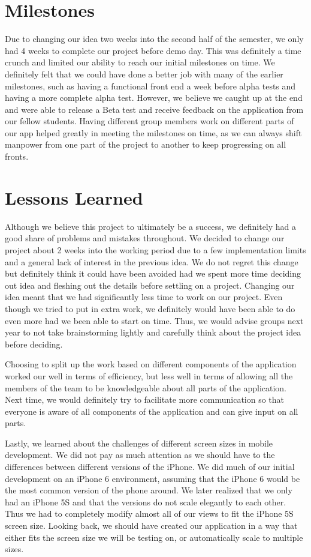 \documentclass[12pt]{article}
\begin{document}
\section{Milestones}
Due to changing our idea two weeks into the second half of the semester, we only had 4 weeks to complete our project before demo day. This was definitely a time crunch and limited our ability to reach our initial milestones on time. We definitely felt that we could have done a better job with many of the earlier milestones, such as having a functional front end a week before alpha tests and having a more complete alpha test. However, we believe we caught up at the end and were able to release a Beta test and receive feedback on the application from our fellow students. Having different group members work on different parts of our app helped greatly in meeting the milestones on time, as we can always shift manpower from one part of the project to another to keep progressing on all fronts.

\section{Lessons Learned}
Although we believe this project to ultimately be a success, we definitely had a good share of problems and mistakes throughout. We decided to change our project about 2 weeks into the working period due to a few implementation limits and a general lack of interest in the previous idea. We do not regret this change but definitely think it could have been avoided had we spent more time deciding out idea and fleshing out the details before settling on a project. Changing our idea meant that we had significantly less time to work on our project. Even though we tried to put in extra work, we definitely would have been able to do even more had we been able to start on time. Thus, we would advise groups next year to not take brainstorming lightly and carefully think about the project idea before deciding. 

Choosing to split up the work based on different components of the application worked our well in terms of efficiency, but less well in terms of allowing all the members of the team to be knowledgeable about all parts of the application. Next time, we would definitely try to facilitate more communication so that everyone is aware of all components of the application and can give input on all parts.

Lastly, we learned about the challenges of different screen sizes in mobile development. We did not pay as much attention as we should have to the differences between different versions of the iPhone. We did much of our initial development on an iPhone 6 environment, assuming that the iPhone 6 would be the most common version of the phone around. We later realized that we only had an iPhone 5S and that the versions do not scale elegantly to each other. Thus we had to completely modify almost all of our views to fit the iPhone 5S screen size. Looking back, we should have created our application in a way that either fits the screen size we will be testing on, or automatically scale to multiple sizes.  
\end{document}
